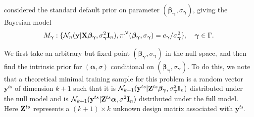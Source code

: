 \documentclass[11pt]{article}
\newcommand{\By}{\mathbf{y}}    \newcommand{\Bz}{\mathbf{z}}
\newcommand{\bfsym}[1]{\ensuremath{\boldsymbol{#1}}}
\def\balpha{\bfsym \alpha}
\def\bbeta{\bfsym \beta}
\def\bgamma{\bfsym \gamma}             \def\bGamma{\bfsym \Gamma}
\theoremstyle{plain}
\theoremstyle{definition}
\theoremstyle{remark}
\begin{document}
\cite{Casella2006Obj} considered the standard default prior on parameter $(\bbeta_{\bgamma},\sigma_{\bgamma})$, giving the Bayesian model
\begin{equation*}
    M_{\bgamma} : \{\mathcal N_n (\By | \BX \bbeta_{\bgamma}, \sigma^2_{\bgamma} \BI_n), \pi^N(\bbeta_{\bgamma}, \sigma_{\bgamma})=c_{\bgamma}/\sigma^2_{\bgamma} \}, \quad \bgamma \in \Gamma.
\end{equation*}

We first take an arbitrary but fixed point $(\bbeta_{\bgamma}, \sigma_{\bgamma})$ in the null space, and then find the intrinsic prior for $(\balpha, \sigma)$ conditional on $(\bbeta_{\bgamma}, \sigma_{\bgamma})$.
To do this, we note that a theoretical minimal training sample for this problem is a random vector $\By^{ts}$ of dimension $k+1$ such that it is $\mathcal N_{k+1} (\By^{ts}|\BZ^{ts} \bbeta_{\bgamma}, \sigma^2_{\bgamma} \BI_n)$ distributed under the null model and is $\mathcal N_{k+1} (\By^{ts}|\BZ^{ts} \balpha, \sigma^2 \BI_n)$ distributed under the full model.
Here $\mathbf{Z}^{ts}$ represents a $(k+1)\times k$ unknown design matrix associated with $\By^{ts}$.
\end{document}
